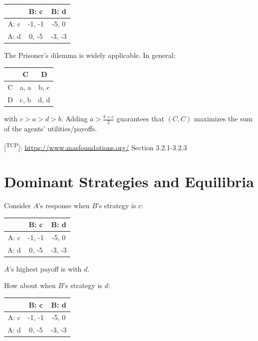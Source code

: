 \documentclass[11pt]{article}
\begin{document}
\begin{tabular}{|c|c|c|}\hline
       & B: c         & B: d         \\\hline
A: c & -1, -1 & -5, 0 \\\hline
A: d & 0, -5  & -3, -3 \\\hline
\end{tabular}


The Prisoner's dilemma is widely applicable.  In general:


\begin{tabular}{|c|c|c|}\hline
       & C         & D        \\\hline
C & a, a & b, c \\\hline
D & c, b & d, d  \\\hline
\end{tabular}


with \(c > a > d > b\).  Adding \(a > \frac{b+c}{2}\) guarantees that \((C, C)\) maximizes the sum of the agents' utilities/payoffs.

{[}\textsuperscript{TCP}]: \url{https://www.masfoundations.org/} Section 3.2.1-3.2.3
\section{Dominant Strategies and Equilibria}
\label{sec:orgeeeb801}




Consider \(A\)'s response when \(B\)'s strategy is \(c\):


\begin{tabular}{|c|c|c|}\hline
       & B: c         & B: d                 \\\hline
A: c & \cellcolor{lightgray} -1, -1 &  -5, 0 \\\hline
A: d & \cellcolor{lightgray} 0, -5   & -3, -3 \\\hline
\end{tabular}


\(A\)'s highest payoff is with \(d\).

How about when \(B\)'s strategy is \(d\):


\begin{tabular}{|c|c|c|}\hline
       & B: c         & B: d                 \\\hline
A: c & -1, -1  & \cellcolor{lightgray} -5, 0  \\\hline
A: d & 0, -5   & \cellcolor{lightgray} -3, -3 \\\hline
\end{tabular}
\end{document}
